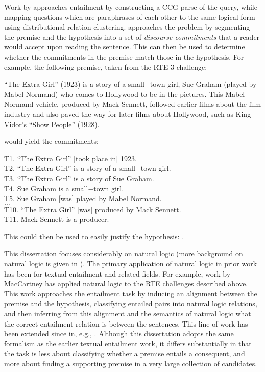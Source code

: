Work by 
  approaches entailment by constructing a CCG parse of the query,
  while mapping questions which are paraphrases of each other to the
  same logical form using distributional relation clustering.
 approaches the problem by segmenting the premise and
  the hypothesis into a set of \textit{discourse commitments} that a reader would
  accept upon reading the sentence.
This can then be used to determine whether the commitments in the premise match those in
  the hypothesis.
For example, the following premise, taken from the RTE-3 challenge:

\begin{displayquote}
``The Extra Girl'' (1923) is a story of a small−town girl, Sue Graham (played by Mabel Normand) who comes to
  Hollywood to be in the pictures. 
This Mabel Normand vehicle, produced by Mack Sennett, followed earlier
  films about the film industry and also paved the way for later films about Hollywood, such as King Vidor’s
  ``Show People'' (1928).
\end{displayquote}

would yield the commitments:

\begin{displayquote}
T1. ``The Extra Girl'' [took place in] 1923. \\
T2. ``The Extra Girl'' is a story of a small−town girl. \\
T3. ``The Extra Girl'' is a story of Sue Graham. \\
T4. Sue Graham is a small−town girl. \\
T5. Sue Graham [was] played by Mabel Normand. \\
$\dots$ \\
T10. ``The Extra Girl'' [was] produced by Mack Sennett. \\
T11. Mack Sennett is a producer.
\end{displayquote}

\noindent This could then be used to easily justify the hypothesis:
  .


This dissertation focuses considerably on natural logic (more background on natural logic is given in ).
The primary application of natural logic in prior work has been
  for textual entailment and related fields.
For example, work by MacCartney 
  \cite{key:2007maccartney-natlog,key:2008maccartney-natlog,key:2009maccartney-natlog}
  has applied natural logic to the RTE challenges described above.
This work approaches the entailment task by inducing an alignment between the premise and the
  hypothesis, classifying entailed pairs into natural logic relations, and then inferring
  from this alignment and the semantics of natural logic what the correct entailment
  relation is between the sentences.
This line of work has been extended since in, e.g., .
Although this dissertation adopts the same formalism as the earlier textual entailment work,
  it differs substantially in that the task is less about classifying whether a premise entails
  a consequent, and more about finding a supporting premise in a very large collection of
  candidates.


